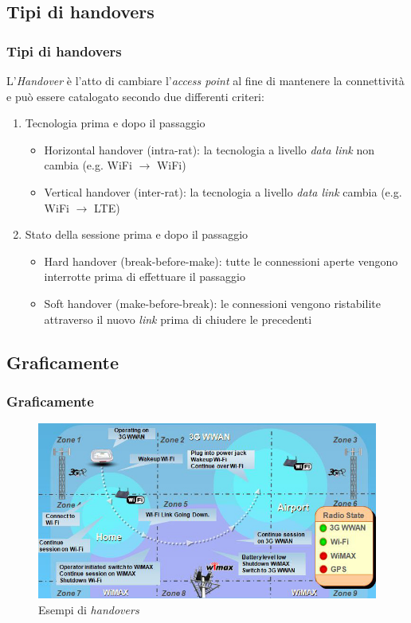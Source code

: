 \documentclass[10pt]{beamer}
\begin{document}
\subsection{Tipi di handovers}
\begin{frame}
\frametitle{Tipi di handovers}
L'{\em Handover} è l'atto di cambiare l'{\em access point} al fine di mantenere la connettività e può essere catalogato secondo due differenti criteri:
\begin{enumerate}
\item Tecnologia prima e dopo il passaggio
\begin{itemize}
\item Horizontal handover (intra-rat): la tecnologia a livello {\em data link} non cambia (e.g. WiFi $\to$ WiFi)
\item Vertical handover (inter-rat): la tecnologia a livello {\em data link} cambia (e.g. WiFi $\to$ LTE)
\end{itemize}

\item Stato della sessione prima e dopo il passaggio
\begin{itemize}
\item Hard handover (break-before-make): tutte le connessioni aperte vengono interrotte prima di effettuare il passaggio
\item Soft handover (make-before-break):  le connessioni vengono ristabilite attraverso il nuovo {\em link} prima di chiudere le precedenti
\end{itemize}
\end{enumerate}
\end{frame}

\subsection{Graficamente}
\begin{frame}
\frametitle{Graficamente}
\begin{figure}[h!]
\centering
\includegraphics[scale=0.4]{handovers.jpg}
\caption{Esempi di {\em handovers}}
\label{fig:handovers}
\end{figure}
\end{frame}
\end{document}
